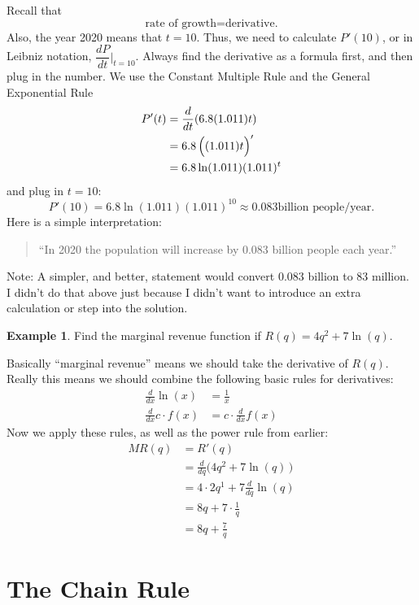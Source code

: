 \documentclass[oneside]{book}
\newcommand{\deriv}[2]{\frac{d#1}{d#2}}
\newcommand{\ddx}{\deriv {}x}
\newcommand{\ddq}{\deriv {}q}
\newcommand{\ddt}{\deriv {}t}
\newcommand{\eval}{\Big|}
\newcommand{\BigParens}[1]
{\left(\raisebox{0in}[1.25\height]{$#1$}\right)}
\theoremstyle{definition}
\newtheorem{example}{Example}
\theoremstyle{solution}
\newtheorem*{solution}{Solution}
\newenvironment{solution}{\vspace{2in}\comment}{\endcomment}
\begin{document}
\begin{solution} 
  Recall that
  $$
  \text{rate of growth} = \text{derivative.}
  $$
Also, the year 2020 means that $t = 10$. Thus, we need to calculate
$P'(10)$, or in Leibniz notation, $\dfrac{dP}{dt}\eval_{t=10}$.
Always find the derivative as a formula first, and then plug in the
number. We use the Constant Multiple Rule and the General Exponential
Rule
\begin{align*} 
  P'(t) &= \ddt (6.8(1.011)t)\\ 
        & = 6.8\BigParens{(1.011)t}'\\ 
        & = 6.8 \ln(1.011)(1.011)^t
\end{align*} 
and plug in $t = 10$:
$$
P'(10) = 6.8 \ln(1.011)(1.011)^{10} \approx 0.083 \text{
      billion people/year}.
$$ 
Here is a simple interpretation:
\begin{quote}
  ``In 2020 the population will increase by 0.083
  billion people each year.''
\end{quote} 
Note: A simpler, and better, statement would convert 0.083 billion to
83 million. I didn't do that above just because I didn't want to
introduce an extra calculation or step into the solution.
\end{solution}

\begin{example}
Find the marginal revenue function if  $R(q) = 4q^2 + 7\ln(q)$.
\end{example}

\begin{solution}
Basically ``marginal revenue'' means we should take the derivative of
$R(q)$.  Really this means we should combine the following basic rules
for derivatives:
\begin{align*}
\ddx \ln(x) & = \frac{1}{x}\\
\ddx c\cdot f(x) & = c\cdot \ddx f(x)
\end{align*}
Now we apply these rules, as well as the power rule from earlier:
\begin{align*}
MR(q) & = R'(q)\\
 & = \ddq \big(4q^2+7\ln(q)\,\big)\\
 & = 4\cdot 2q^1 + 7 \ddq \ln(q)\\
 & = 8q+7\cdot \frac 1q\\
 & =  8q + \frac{7}{q}
\end{align*}
\end{solution}


\section{The Chain Rule}
\end{document}
